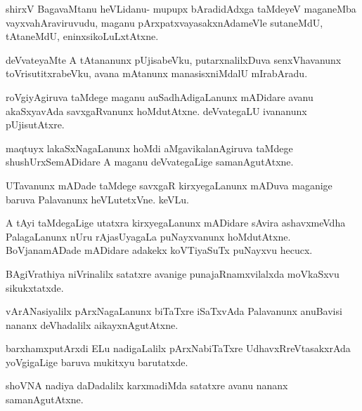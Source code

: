 \documentclass{article}
\begin{document}
\begin{mng}%
shirxV BagavaMtanu heVLidanu- mupupx bAradidAdxga taMdeyeV
maganeMba vayxvahAraviruvudu, maganu pArxpatxvayasakxnAdameVle sutaneMdU,
tAtaneMdU, eninxsikoLuLxtAtxne.
\end{mng}

\begin{mng}%
deVvateyaMte A tAtananunx pUjisabeVku, putarxnalilxDuva
senxVhavanunx toVrisutitxrabeVku, avana mAtanunx manasisxniMdalU mIrabAradu.
\end{mng}

\begin{mng}%
roVgiyAgiruva taMdege maganu auSadhAdigaLanunx mADidare
avanu akaSxyavAda savxgaRvanunx hoMdutAtxne. deVvategaLU ivananunx
pUjisutAtxre.
\end{mng}

\begin{mng}%
maqtuyx lakaSxNagaLanunx hoMdi aMgavikalanAgiruva taMdege
shushUrxSemADidare A maganu deVvategaLige samanAgutAtxne.
\end{mng}

\begin{mng}%
UTavanunx mADade taMdege savxgaR kirxyegaLanunx mADuva
maganige baruva Palavanunx heVLutetxVne. keVLu.
\end{mng}

\begin{mng}%
A tAyi taMdegaLige utatxra kirxyegaLanunx mADidare sAvira
ashavxmeVdha PalagaLanunx nUru rAjasUyagaLa puNayxvanunx hoMdutAtxne.
BoVjanamADade mADidare adakekx koVTiyaSuTx puNayxvu hecucx.
\end{mng}

\begin{mng}%
BAgiVrathiya niVrinalilx satatxre avanige punajaRnamxvilalxda moVkaSxvu
sikukxtatxde.
\end{mng}

\begin{mng}%
vArANasiyalilx pArxNagaLanunx biTaTxre iSaTxvAda Palavanunx anuBavisi
nananx deVhadalilx aikayxnAgutAtxne.
\end{mng}

\begin{mng}%
barxhamxputArxdi ELu nadigaLalilx pArxNabiTaTxre UdhavxRreVtasakxrAda
yoVgigaLige baruva mukitxyu barutatxde.
\end{mng}

\begin{mng}%
shoVNA nadiya daDadalilx karxmadiMda satatxre avanu nananx samanAgutAtxne.
\end{mng}
\end{document}
